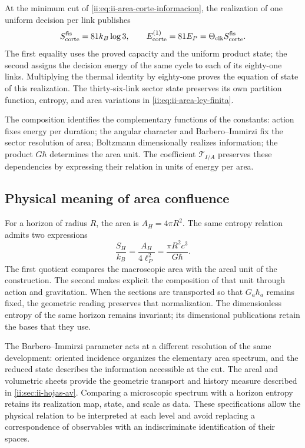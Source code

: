 At the minimum cut of \eqref{ii:eq:ii-area-corte-informacion}, the
realization of one uniform decision per link publishes
\begin{equation}
 S_{\rm corte}^{\rm fis}=81k_B\log3,
 \qquad
 E_{\rm corte}^{(1)}=81E_P
 =\Theta_{\rm clk}S_{\rm corte}^{\rm fis}.
 \label{ii:eq:ii-confluencia-corte-energia}
\end{equation}
The first equality uses the proved capacity and the uniform product
state; the second assigns the decision energy of the same cycle to
each of its eighty-one links. Multiplying the thermal identity
by eighty-one proves the equation of state of this realization.
The thirty-six-link sector state preserves its own
partition function, entropy, and area variations in
\eqref{ii:eq:ii-area-ley-finita}.

The composition identifies the complementary functions of the
constants: action fixes energy per duration; the angular character
and Barbero--Immirzi fix the sector resolution of area; Boltzmann
dimensionally realizes information; the product \(G\hbar\)
determines the area unit. The coefficient \(\mathcal T_{I/A}\)
preserves these dependencies by expressing their relation in units of
energy per area.

\subsection{Physical meaning of area confluence}

For a horizon of radius \(R\), the area is \(A_H=4\pi R^2\).
The same entropy relation admits two expressions
\[
 \frac{S_H}{k_B}=\frac{A_H}{4\ell_P^2}
 =\frac{\pi R^2c^3}{G\hbar}.
\]
The first quotient compares the macroscopic area with the areal unit
of the construction. The second makes explicit the composition of that unit
through action and gravitation. When the sections are transported so
that \(G_a\hbar_a\) remains fixed, the geometric reading preserves
that normalization. The dimensionless entropy of the same horizon remains
invariant; its dimensional publications retain the bases that
they use.

The Barbero--Immirzi parameter acts at a different resolution
of the same development: oriented incidence organizes the elementary
area spectrum, and the reduced state describes the information
accessible at the cut. The areal and volumetric sheets provide the
geometric transport and history measure described in
\cref{ii:sec:ii-hojas-av}. Comparing a microscopic spectrum
with a horizon entropy retains its realization map,
state, and scale as data. These specifications allow the
physical relation to be interpreted at each level and avoid replacing a correspondence
of observables with an indiscriminate identification of their spaces.

